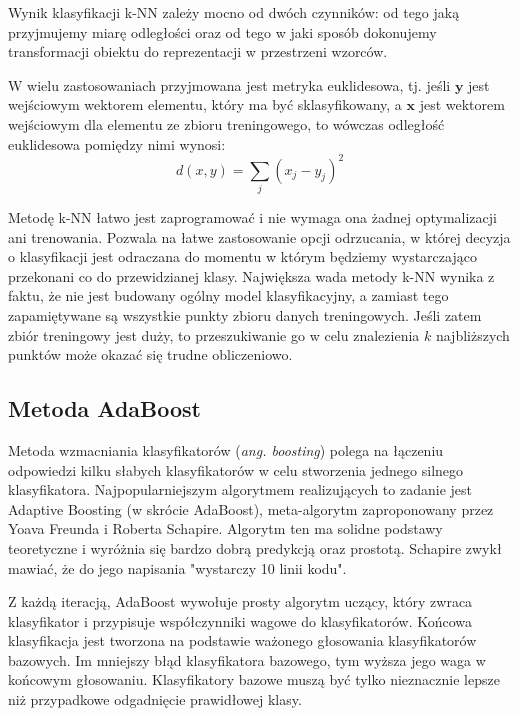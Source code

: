 Wynik klasyfikacji k-NN zależy mocno od dwóch czynników: od tego jaką przyjmujemy miarę odległości oraz od tego w jaki sposób dokonujemy transformacji obiektu do reprezentacji w przestrzeni wzorców.\cite{MORZY13}

W wielu zastosowaniach przyjmowana jest metryka euklidesowa, tj. jeśli $\boldsymbol{y}$ jest wejściowym wektorem elementu, który ma być sklasyfikowany, a $\boldsymbol{x}$ jest wektorem wejściowym dla elementu ze zbioru treningowego, to wówczas odległość euklidesowa pomiędzy nimi wynosi:
\begin{equation} 
\label{knn-euclides} 
d(x, y) = \sum_j (x_j - y_j)^2
\end{equation}

Metodę k-NN łatwo jest zaprogramować i nie wymaga ona żadnej optymalizacji ani trenowania. Pozwala na łatwe zastosowanie opcji odrzucania, w której decyzja o klasyfikacji jest odraczana do momentu w którym będziemy wystarczająco przekonani co do przewidzianej klasy. Największa wada metody k-NN wynika z faktu, że nie jest budowany ogólny model klasyfikacyjny, a zamiast tego zapamiętywane są wszystkie punkty zbioru danych treningowych. Jeśli zatem zbiór treningowy jest duży, to przeszukiwanie go w celu znalezienia $k$ najbliższych punktów może okazać się trudne obliczeniowo.\cite{HAND01}

\subsection{Metoda AdaBoost}
Metoda wzmacniania klasyfikatorów (\emph{ang. boosting}) polega na łączeniu odpowiedzi kilku słabych klasyfikatorów w celu stworzenia jednego silnego klasyfikatora. Najpopularniejszym algorytmem realizujących to zadanie jest Adaptive Boosting (w skrócie AdaBoost), meta-algorytm zaproponowany przez Yoava Freunda i Roberta Schapire.\cite{FREUND97} Algorytm ten ma solidne podstawy teoretyczne i wyróżnia się bardzo dobrą predykcją oraz prostotą. Schapire zwykł mawiać, że do jego napisania "wystarczy 10 linii kodu".

Z każdą iteracją, AdaBoost wywołuje prosty algorytm uczący, który zwraca klasyfikator i przypisuje współczynniki wagowe do klasyfikatorów. Końcowa klasyfikacja jest tworzona na podstawie ważonego głosowania klasyfikatorów bazowych. Im mniejszy błąd klasyfikatora bazowego, tym wyższa jego waga w końcowym głosowaniu. Klasyfikatory bazowe muszą być tylko nieznacznie lepsze niż przypadkowe odgadnięcie prawidłowej klasy.\cite{KEGL09}

